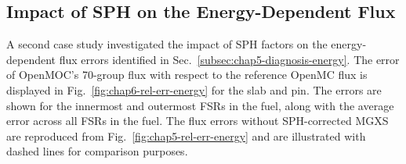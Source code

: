\subsection{Impact of SPH on the Energy-Dependent Flux}
\label{subsec:chap6-sph-flux-energy}

A second case study investigated the impact of \ac{SPH} factors on the energy-dependent flux errors identified in Sec.~\ref{subsec:chap5-diagnosis-energy}. The error of OpenMOC's 70-group flux with respect to the reference OpenMC flux is displayed in Fig.~\ref{fig:chap6-rel-err-energy} for the slab and pin. The errors are shown for the innermost and outermost \ac{FSR}s in the fuel, along with the average error across all \ac{FSR}s in the fuel. The flux errors without \ac{SPH}-corrected \ac{MGXS} are reproduced from Fig.~\ref{fig:chap5-rel-err-energy} and are illustrated with dashed lines for comparison purposes. 


